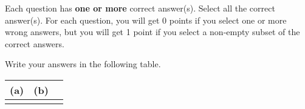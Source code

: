 
Each question has \textbf{one or more} correct answer(s). Select all the correct answer(s). For each question, you will get 0 points if you select one or more wrong answers, but you will get 1 point if you select a non-empty subset of the correct answers.

Write your answers in the following table.


\begin{table}[htbp]
    \centering
    \begin{tabular}{|p{2cm}|p{2cm}|p{2cm}|}
        \hline
        (a) & (b) \\
        \hline
            &     \\
        \hline
    \end{tabular}
\end{table}

